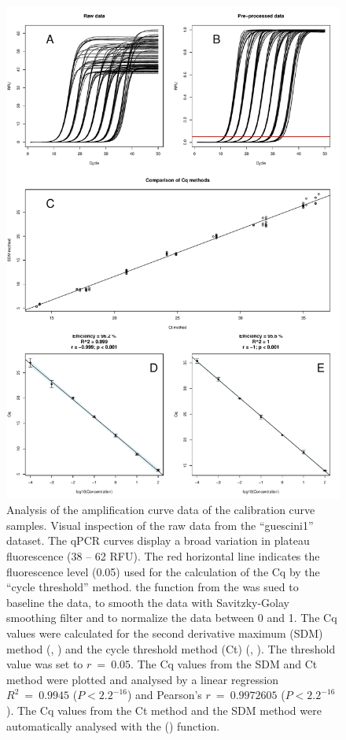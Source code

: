 \begin{figure}[htbp]
  \centering
  \includegraphics[clip=true, width=14cm]{figures/dilution_Cq.pdf}
  \caption{Analysis of the amplification curve data of the calibration curve 
samples.  Visual inspection of the raw data from the ``guescini1'' 
dataset. The qPCR curves display a broad variation in plateau fluorescence (38 
-- 62 RFU). The red horizontal line indicates the fluorescence level (0.05) used 
for the calculation of the Cq by the ``cycle threshold'' method.  
the  function from the  was sued to baseline the 
data, to smooth the data with Savitzky-Golay smoothing filter and to normalize 
the data between 0 and 1.  The Cq values were calculated for the 
second derivative maximum (SDM) method (, ) and the 
cycle threshold method (Ct) (, ). The threshold 
value was set to $r~=~0.05$. The Cq values from the SDM and Ct method were 
plotted and analysed by a linear regression $R^{2}~=~0.9945$ ($P < 2.2^{-16}$) 
and Pearson's $r~=~0.9972605$ ($P < 2.2^{-16}$). The Cq values from  
the Ct method and  the SDM method were automatically analysed with 
the  () function.}
  \label{figure:dilution_Cq}
\end{figure}

